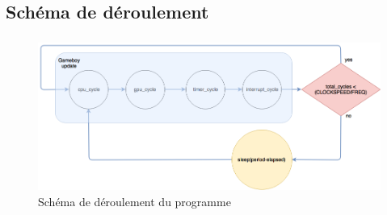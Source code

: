 \documentclass{beamer}
\begin{document}
\subsection{Schéma de déroulement}
\begin{frame}
	\frametitle{\secname}
  \framesubtitle{\subsecname}
  \begin{center}
    \begin{figure}
      \includegraphics[width=.65\textwidth]{images/schema.png}
      \caption{Schéma de déroulement du programme}
    \end{figure}
  \end{center}
\end{frame}

\end{document}
